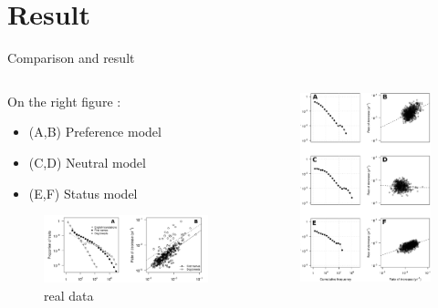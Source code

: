 \documentclass{beamer}
\begin{document}
\section{Result}
\begin{frame}{Comparison and result}

	\begin{columns}
		\begin{column}{.4\textwidth}
		    On the right figure :
		 \begin{itemize}
		     \item (A,B) Preference model
		     \item (C,D) Neutral model
		     \item (E,F) Status model
		 \end{itemize}
			\begin{figure}
				\includegraphics[width=5cm]{realdata.png}
				\caption{real data}
			\end{figure}


		\end{column}
		\begin{column}{.6\textwidth}
			\begin{figure}
				\includegraphics[width=4cm]{3modelcomp.png}
			\end{figure}
		\end{column}
	\end{columns}
	
\end{frame}
\end{document}
